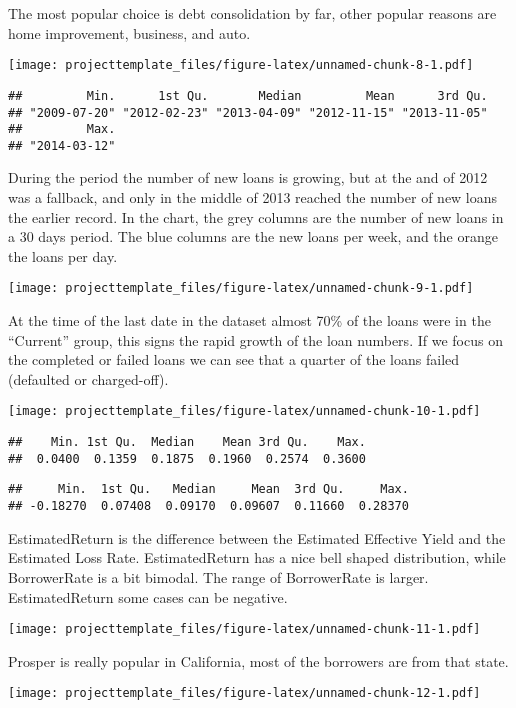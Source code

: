 \documentclass[]{article}
\begin{document}
The most popular choice is debt consolidation by far, other popular
reasons are home improvement, business, and auto.

\texttt{[image: projecttemplate\_files/figure-latex/unnamed-chunk-8-1.pdf]}

\begin{verbatim}
##         Min.      1st Qu.       Median         Mean      3rd Qu. 
## "2009-07-20" "2012-02-23" "2013-04-09" "2012-11-15" "2013-11-05" 
##         Max. 
## "2014-03-12"
\end{verbatim}

During the period the number of new loans is growing, but at the and of
2012 was a fallback, and only in the middle of 2013 reached the number
of new loans the earlier record. In the chart, the grey columns are the
number of new loans in a 30 days period. The blue columns are the new
loans per week, and the orange the loans per day.

\texttt{[image: projecttemplate\_files/figure-latex/unnamed-chunk-9-1.pdf]}

At the time of the last date in the dataset almost 70\% of the loans
were in the ``Current'' group, this signs the rapid growth of the loan
numbers. If we focus on the completed or failed loans we can see that a
quarter of the loans failed (defaulted or charged-off).

\texttt{[image: projecttemplate\_files/figure-latex/unnamed-chunk-10-1.pdf]}

\begin{verbatim}
##    Min. 1st Qu.  Median    Mean 3rd Qu.    Max. 
##  0.0400  0.1359  0.1875  0.1960  0.2574  0.3600
\end{verbatim}

\begin{verbatim}
##     Min.  1st Qu.   Median     Mean  3rd Qu.     Max. 
## -0.18270  0.07408  0.09170  0.09607  0.11660  0.28370
\end{verbatim}

EstimatedReturn is the difference between the Estimated Effective Yield
and the Estimated Loss Rate. EstimatedReturn has a nice bell shaped
distribution, while BorrowerRate is a bit bimodal. The range of
BorrowerRate is larger. EstimatedReturn some cases can be negative.

\texttt{[image: projecttemplate\_files/figure-latex/unnamed-chunk-11-1.pdf]}

Prosper is really popular in California, most of the borrowers are from
that state.

\texttt{[image: projecttemplate\_files/figure-latex/unnamed-chunk-12-1.pdf]}
\end{document}
